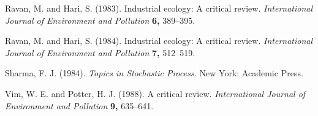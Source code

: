\documentclass[useAMS,usenatbib,referee]{example/biom}
\begin{document}
\begin{thebibliography}{}
 Ravan,
M. and Hari, S. (1983). Industrial ecology: A  critical review.
{\it International Journal of Environment and Pollution} {\bf 6,} 389--395.

Ravan, M. and Hari, S. (1984). Industrial ecology: A  critical
review. {\it International Journal of Environment and Pollution} {\bf 7,} 512--519.

 Sharma,
F. J. (1984). {\it Topics in Stochastic Process.} New York: Academic Press.

 Vim, W.
E. and Potter, H. J. (1988). A  critical
review. {\it International Journal of Environment and Pollution} {\bf 9,} 635--641.

\end{thebibliography}

\label{lastpage}
\end{document}
